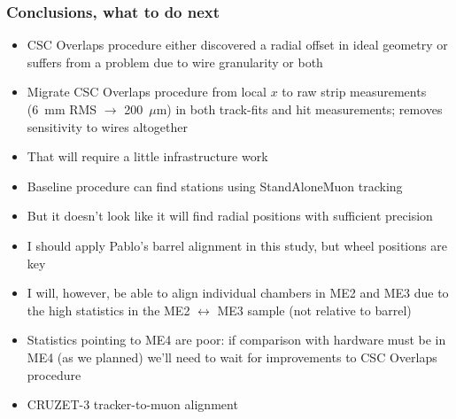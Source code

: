 \documentclass[compress]{beamer}
\begin{document}
\begin{frame}
\frametitle{Conclusions, what to do next}
\scriptsize

\begin{itemize}\setlength{\itemsep}{0.2 cm}
\item CSC Overlaps procedure either discovered a radial offset in
  ideal geometry or suffers from a problem due to wire granularity or
  both
\item Migrate CSC Overlaps procedure from local $x$ to raw strip
  measurements (6~mm RMS $\to$ 200~$\mu$m) in both track-fits and hit
  measurements; removes sensitivity to wires altogether
\item That will require a little infrastructure work
\item Baseline procedure can find stations using StandAloneMuon tracking
\item But it doesn't look like it will find radial positions with
  sufficient precision
\item I should apply Pablo's barrel alignment in this study, but wheel
  positions are key
\item I will, however, be able to align individual chambers in ME2 and
  ME3 due to the high statistics in the ME2 $\leftrightarrow$ ME3
  sample (not relative to barrel)
\item Statistics pointing to ME4 are poor: if comparison with hardware
  must be in ME4 (as we planned) we'll need to wait for improvements
  to CSC Overlaps procedure
\item CRUZET-3 tracker-to-muon alignment
\end{itemize}
\label{numpages}
\end{frame}
\end{document}
